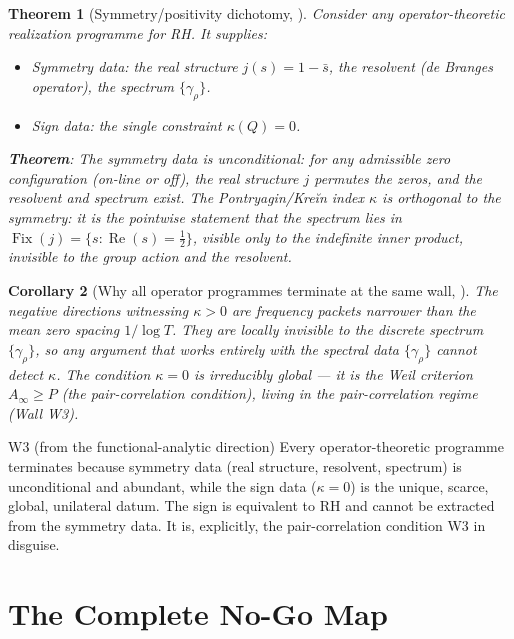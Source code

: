 \documentclass[11pt]{amsart}
\newtheorem{theorem}{Theorem}[section]
\newtheorem{corollary}[theorem]{Corollary}
\theoremstyle{definition}
\theoremstyle{remark}
\renewcommand{\Re}{\operatorname{Re}}
\newcommand{\half}{\tfrac{1}{2}}
\newcommand{\kap}{\kappa}
\newcommand{\gam}{\gamma}
\begin{document}
\begin{theorem}[Symmetry/positivity dichotomy, \cite{RP25}]
\label{thm:sym-pos}
Consider any operator-theoretic realization programme for RH.  It supplies:
\begin{itemize}
  \item \emph{Symmetry data}: the real structure $j(s)=1-\bar s$, the resolvent
    (de Branges operator), the spectrum $\{\gam_\rho\}$.
  \item \emph{Sign data}: the single constraint $\kap(Q)=0$.
\end{itemize}
\textbf{Theorem}: The symmetry data is \emph{unconditional}: for any admissible
zero configuration (on-line or off), the real structure $j$ permutes the zeros, and
the resolvent and spectrum exist.  The Pontryagin/Kreĭn index $\kap$ is
\emph{orthogonal} to the symmetry: it is the pointwise statement that the spectrum
lies in $\operatorname{Fix}(j)=\{s:\Re(s)=\half\}$, visible only to the indefinite inner product,
invisible to the group action and the resolvent.
\end{theorem}

\begin{corollary}[Why all operator programmes terminate at the same wall, \cite{RP25}]
The negative directions witnessing $\kap>0$ are frequency packets narrower than the
mean zero spacing $1/\log T$.  They are locally invisible to the discrete spectrum
$\{\gam_\rho\}$, so any argument that works entirely with the spectral data
$\{\gam_\rho\}$ cannot detect $\kap$.  The condition $\kap=0$ is irreducibly global
--- it is the Weil criterion $A_\infty\ge P$ (the pair-correlation condition), living
in the pair-correlation regime (Wall W3).
\end{corollary}

\begin{wallbox}{W3 (from the functional-analytic direction)}
Every operator-theoretic programme terminates because symmetry data (real structure,
resolvent, spectrum) is unconditional and abundant, while the sign data ($\kap=0$)
is the unique, scarce, global, unilateral datum.  The sign is equivalent to RH and
cannot be extracted from the symmetry data.  It is, explicitly, the pair-correlation
condition W3 in disguise.
\end{wallbox}

\section{The Complete No-Go Map}
\label{sec:nogo}
\end{document}
